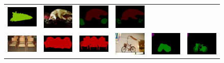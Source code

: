 \begin{figure}[!htbp]
{\begin{tabular}{c c c | c c c}
    \includegraphics[height=0.12\linewidth]{fig/res_crf/2007_003957.png} &
    \includegraphics[height=0.12\linewidth]{fig/img/2007_003991.jpg} &
    \includegraphics[height=0.12\linewidth]{fig/res_none/2007_003991.png} &
    \includegraphics[height=0.12\linewidth]{fig/res_crf/2007_003991.png} \\
    \includegraphics[height=0.10\linewidth]{fig/img/2008_001439.jpg} &
    \includegraphics[height=0.10\linewidth]{fig/res_none/2008_001439.png} &
    \includegraphics[height=0.10\linewidth]{fig/res_crf/2008_001439.png} &
    \includegraphics[height=0.12\linewidth]{fig/img/2008_004363.jpg} &
    \includegraphics[height=0.12\linewidth]{fig/res_none/2008_004363.png} &
    \includegraphics[height=0.12\linewidth]{fig/res_crf/2008_004363.png} \\

\end{tabular}}
\end{figure}
